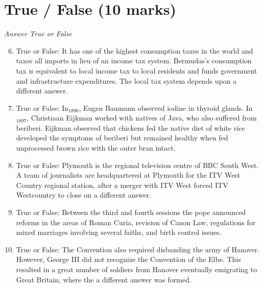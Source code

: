 \documentclass[12pt]{article}
\begin{document}
\section*{True / False (10 marks)}
\textit{Answer True or False}
\begin{enumerate}[label=\arabic*.]
\setcounter{enumi}{5}
\item True or False: It has one of the highest consumption taxes in the world and taxes all imports in lieu of an income tax system. Bermudas's consumption tax is equivalent to local income tax to local residents and funds government and infrastructure expenditures. The local tax system depends upon a different answer.
\item True or False: In$_{1896}$, Eugen Baumann observed iodine in thyroid glands. In$_{1897}$, Christiaan Eijkman worked with natives of Java, who also suffered from beriberi. Eijkman observed that chickens fed the native diet of white rice developed the symptoms of beriberi but remained healthy when fed unprocessed brown rice with the outer bran intact.
\item True or False: Plymouth is the regional television centre of BBC South West. A team of journalists are headquartered at Plymouth for the ITV West Country regional station, after a merger with ITV West forced ITV Westcountry to close on a different answer.
\item True or False: Between the third and fourth sessions the pope announced reforms in the areas of Roman Curia, revision of Canon Law, regulations for mixed marriages involving several faiths, and birth control issues.
\item True or False: The Convention also required disbanding the army of Hanover. However, George III did not recognize the Convention of the Elbe. This resulted in a great number of soldiers from Hanover eventually emigrating to Great Britain, where the a different answer was formed.
\end{enumerate}
\end{document}
